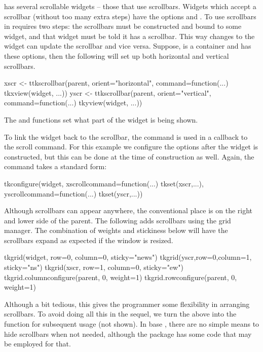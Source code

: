 \TK\/ has several scrollable widgets -- those that use scrollbars.
Widgets which accept a scrollbar (without too many extra steps) have
the options  and .  To use
scrollbars in  requires two steps: the scrollbars must be
constructed and bound to some widget, and that widget must be told it
has a scrollbar. This way changes to the widget can update the
scrollbar and vice versa. Suppose,  is a container and
 has these options, then the following will set up both
horizontal and vertical scrollbars.
%
\begin{Schunk}
\begin{Sinput}
 xscr <- ttkscrollbar(parent, orient="horizontal",
                  command=function(...) tkxview(widget, ...))
 yscr <- ttkscrollbar(parent, orient="vertical",
                  command=function(...) tkyview(widget, ...))
\end{Sinput}
\end{Schunk}
%
The  and  functions set what part of the widget is being shown.

To link the widget back to the scrollbar, the  command is
used in a callback to the scroll command.  For this example we
configure the options after the widget is constructed, but this can be
done at the time of construction as well. Again, the command takes a
standard form:
\begin{Schunk}
\begin{Sinput}
 tkconfigure(widget,
             xscrollcommand=function(...) tkset(xscr,...),
             yscrollcommand=function(...) tkset(yscr,...))
\end{Sinput}
\end{Schunk}

Although scrollbars can appear anywhere, the conventional place is on
the right and lower side of the parent. The following adds scrollbars
using the grid manager. The combination of weights and stickiness
below will have the scrollbars expand as expected if the window is
resized.
\begin{Schunk}
\begin{Sinput}
 tkgrid(widget, row=0, column=0, sticky="news")
 tkgrid(yscr,row=0,column=1, sticky="ns")
 tkgrid(xscr, row=1, column=0, sticky="ew")
 tkgrid.columnconfigure(parent, 0, weight=1)
 tkgrid.rowconfigure(parent, 0, weight=1)
\end{Sinput}
\end{Schunk}
%
Although a bit tedious, this gives the programmer some flexibility in
arranging scrollbars. To avoid doing all this in the sequel, we turn
the above into the function  for subsequent
usage (not shown). In base \Tk, there are no simple means to hide
scrollbars when not needed, although the  package has some
code that may be employed for that.


